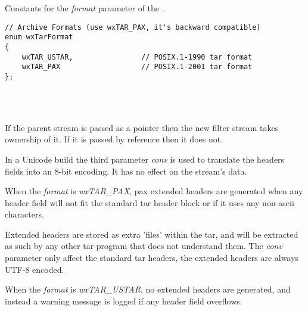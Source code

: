 Constants for the {\it format} parameter of the
 .

\begin{verbatim}
// Archive Formats (use wxTAR_PAX, it's backward compatible)
enum wxTarFormat
{
    wxTAR_USTAR,                // POSIX.1-1990 tar format
    wxTAR_PAX                   // POSIX.1-2001 tar format
};

\end{verbatim}


\\
\\




\label{wxtaroutputstreamwxtaroutputstream}



If the parent stream is passed as a pointer then the new filter stream
takes ownership of it. If it is passed by reference then it does not.

In a Unicode build the third parameter {\it conv} is used to translate the
headers fields into an 8-bit encoding. It has no effect on the stream's data.

When the {\it format} is {\it wxTAR\_PAX}, pax extended headers are generated
when any header field will not fit the standard tar header block or if it
uses any non-ascii characters.

Extended headers are stored as extra 'files' within the tar, and will be
extracted as such by any other tar program that does not understand them.
The {\it conv} parameter only affect the standard tar headers, the extended
headers are always UTF-8 encoded.

When the {\it format} is {\it wxTAR\_USTAR}, no extended headers are
generated, and instead a warning message is logged if any header field
overflows.


\label{wxtaroutputstreamdtor}


